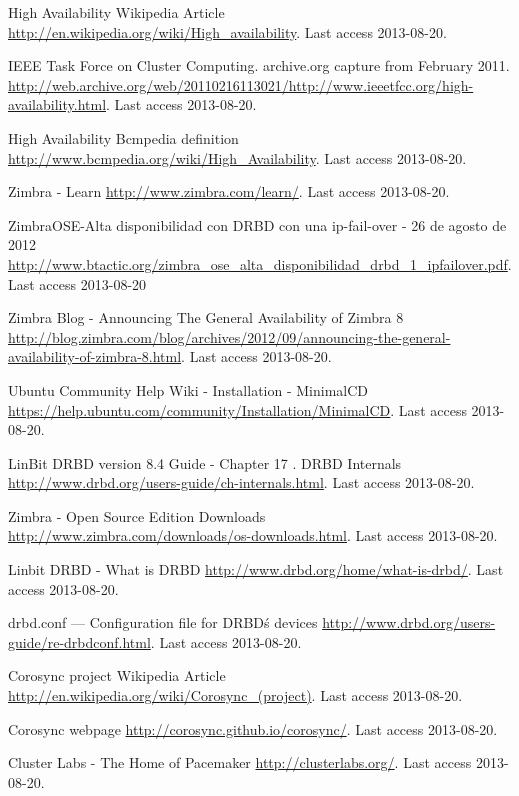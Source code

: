 
\begin{thebibliography}{1}


 High Availability Wikipedia Article
\url{http://en.wikipedia.org/wiki/High_availability}. Last access 2013-08-20.

 IEEE Task Force on Cluster Computing. archive.org capture from February 2011.
\url{http://web.archive.org/web/20110216113021/http://www.ieeetfcc.org/high-availability.html}. Last access 2013-08-20.

 High Availability Bcmpedia definition
\url{http://www.bcmpedia.org/wiki/High_Availability}. Last access 2013-08-20.

 Zimbra - Learn
\url{http://www.zimbra.com/learn/}. Last access 2013-08-20.

 ZimbraOSE-Alta disponibilidad con DRBD con una ip-fail-over - 26 de agosto de 2012
\url{http://www.btactic.org/zimbra_ose_alta_disponibilidad_drbd_1_ipfailover.pdf}. Last access 2013-08-20

 Zimbra Blog - Announcing The General Availability of Zimbra 8
\url{http://blog.zimbra.com/blog/archives/2012/09/announcing-the-general-availability-of-zimbra-8.html}. Last access 2013-08-20.


 Ubuntu Community Help Wiki - Installation - MinimalCD
\url{https://help.ubuntu.com/community/Installation/MinimalCD}. Last access 2013-08-20.

 LinBit DRBD version 8.4 Guide - Chapter 17 . DRBD Internals
\url{http://www.drbd.org/users-guide/ch-internals.html}. Last access 2013-08-20.


 Zimbra - Open Source Edition Downloads
\url{http://www.zimbra.com/downloads/os-downloads.html}. Last access 2013-08-20.


 Linbit DRBD - What is DRBD
\url{http://www.drbd.org/home/what-is-drbd/}. Last access 2013-08-20.

 drbd.conf — Configuration file for DRBD\'s devices
\url{http://www.drbd.org/users-guide/re-drbdconf.html}. Last access 2013-08-20.


 Corosync project Wikipedia Article
\url{http://en.wikipedia.org/wiki/Corosync_(project)}. Last access 2013-08-20.

 Corosync webpage
\url{http://corosync.github.io/corosync/}. Last access 2013-08-20.

 Cluster Labs - The Home of Pacemaker
\url{http://clusterlabs.org/}. Last access 2013-08-20.

\end{thebibliography}

